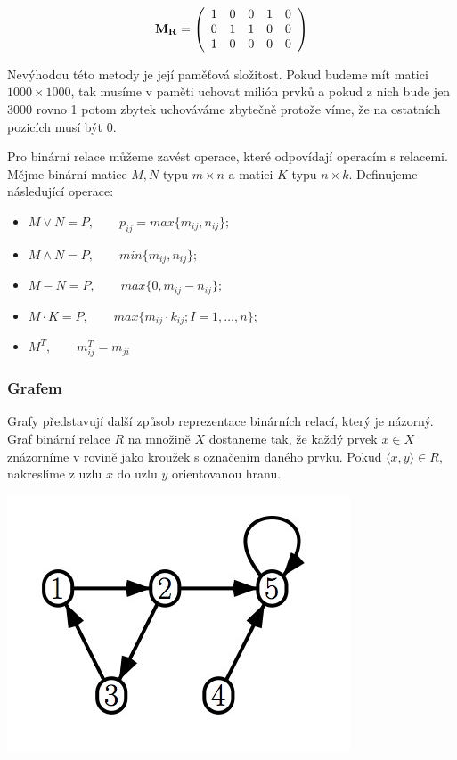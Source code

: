 \documentclass[12pt,a4paper]{article}
\begin{document}
\begin{displaymath}
{\bf M_R} =
\left( \begin{array}{ccccc}
1 & 0 & 0 & 1 & 0 \\
0 & 1 & 1 & 0 & 0 \\
1 & 0 & 0 & 0 & 0 \\
\end{array} \right)
\end{displaymath}

Nevýhodou této metody je její paměťová složitost. Pokud budeme mít matici $1000 \times 1000$, tak musíme v paměti uchovat milión prvků a pokud z nich bude jen 3000 rovno 1 potom zbytek uchováváme zbytečně protože víme, že na ostatních pozicích musí být 0.

Pro binární relace můžeme zavést operace, které odpovídají operacím s relacemi. Mějme binární matice $M,N$ typu $m \times n$ a matici $K$ typu $n \times k$. Definujeme následující operace:
\begin{itemize}
	\item[] $M \vee N = P, \qquad p_{ij} = max\{m_{ij}, n_{ij}\};$
	\item[] $M \wedge N = P, \qquad min\{m_{ij}, n_{ij}\};$
	\item[] $M - N = P, \qquad max\{0, m_{ij} - n_{ij}\};$
	\item[] $M \cdot K = P, \qquad max\{m_{ij} \cdot k_{ij}; I = 1, \dots ,n\};$
	\item[] $M^T, \qquad m^T_{ij} = m_{ji}$
\end{itemize}

\subsubsection{Grafem}
Grafy představují další způsob reprezentace binárních relací, který je názorný. Graf binární relace $R$ na množině $X$ dostaneme tak, že každý prvek $x \in X$ znázorníme v rovině jako kroužek s označením daného prvku. Pokud $\langle x,y \rangle \in R$, nakreslíme z uzlu $x$ do uzlu $y$ orientovanou hranu.

\begin{center}
	\includegraphics[scale=0.6]{img/RelationGraph}
\end{center}
\end{document}
